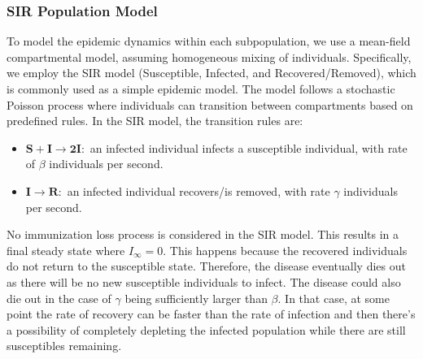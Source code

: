 \subsubsection{SIR Population Model}
To model the epidemic dynamics within each subpopulation, we use a mean-field compartmental model, assuming homogeneous mixing of individuals. Specifically, we employ the SIR model (Susceptible, Infected, and Recovered/Removed), which is commonly used as a simple epidemic model. The model follows a stochastic Poisson process where individuals can transition between compartments based on predefined rules. In the SIR model, the transition rules are:
\begin{itemize}
    \item $\mathbf{S + I \rightarrow 2I:}$ an infected individual infects a susceptible individual, with rate of $\beta$ individuals per second.
    \item $\mathbf{I \rightarrow R:}$ an infected individual recovers/is removed, with rate $\gamma$ individuals per second.
    
\end{itemize}

No immunization loss process is considered in the SIR model. This results in a final steady state where $I_\infty=0$. This happens because the recovered individuals do not return to the susceptible state. Therefore, the disease eventually dies out as there will be no new susceptible individuals to infect. The disease could also die out in the case of $\gamma$ being sufficiently larger than $\beta$. In that case, at some point the rate of recovery can be faster than the rate of infection and then there's a possibility of completely depleting the infected population while there are still susceptibles remaining.

